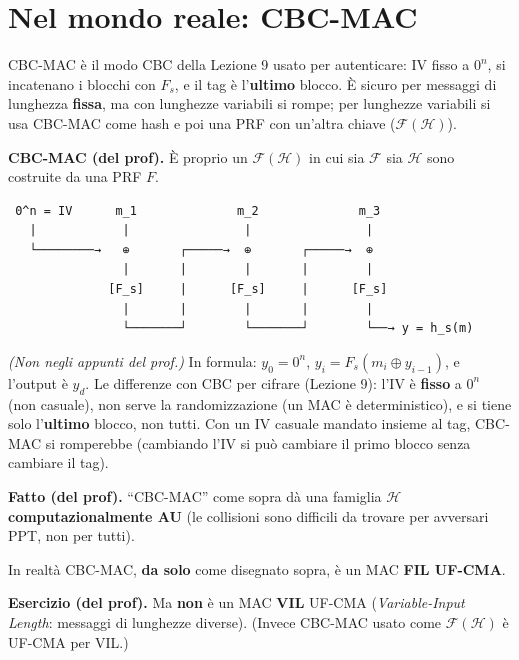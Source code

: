 \section{Nel mondo reale: CBC-MAC}

\begin{inbreve}
CBC-MAC è il modo CBC della Lezione 9 usato per autenticare: IV fisso a \(0^n\), si incatenano i blocchi con \(F_s\), e il tag è l'\textbf{ultimo} blocco. È sicuro per messaggi di lunghezza \textbf{fissa}, ma con lunghezze variabili si rompe; per lunghezze variabili si usa CBC-MAC come hash e poi una PRF con un'altra chiave (\(\mathcal{F}(\mathcal{H})\)).
\end{inbreve}

\textbf{CBC-MAC (del prof).} È proprio un \(\mathcal{F}(\mathcal{H})\) in cui sia \(\mathcal{F}\) sia \(\mathcal{H}\) sono costruite da una PRF \(F\).

\begin{verbatim}
 0^n = IV      m_1              m_2              m_3
   |            |                |                |
   └────────→   ⊕       ┌─────→  ⊕       ┌─────→  ⊕
                |       |        |       |        |
              [F_s]     |      [F_s]     |      [F_s]
                |       |        |       |        |
                └───────┘        └───────┘        └──→ y = h_s(m)
\end{verbatim}

\begin{nota}
\emph{(Non negli appunti del prof.)} In formula: \(y_0 = 0^n\), \(y_i = F_s(m_i \oplus y_{i-1})\), e l'output è \(y_d\). Le differenze con CBC per cifrare (Lezione 9): l'IV è \textbf{fisso} a \(0^n\) (non casuale), non serve la randomizzazione (un MAC è deterministico), e si tiene solo l'\textbf{ultimo} blocco, non tutti. Con un IV casuale mandato insieme al tag, CBC-MAC si romperebbe (cambiando l'IV si può cambiare il primo blocco senza cambiare il tag).
\end{nota}

\textbf{Fatto (del prof).} ``CBC-MAC'' come sopra dà una famiglia \(\mathcal{H}\) \textbf{computazionalmente AU} (le collisioni sono difficili da trovare per avversari PPT, non per tutti).

In realtà CBC-MAC, \textbf{da solo} come disegnato sopra, è un MAC \textbf{FIL UF-CMA}.

\textbf{Esercizio (del prof).} Ma \textbf{non} è un MAC \textbf{VIL} UF-CMA (\emph{Variable-Input Length}: messaggi di lunghezze diverse). (Invece CBC-MAC usato come \(\mathcal{F}(\mathcal{H})\) è UF-CMA per VIL.)

